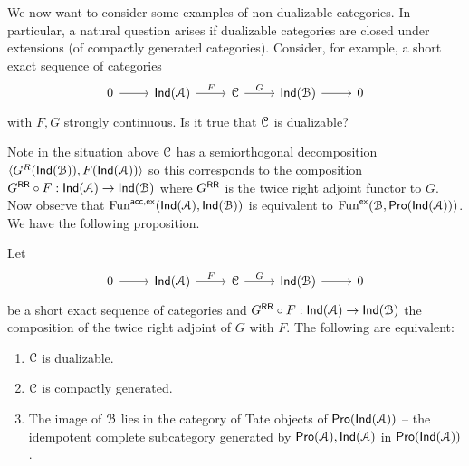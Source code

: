 We now want to consider some examples of non-dualizable categories. In particular, a natural question arises if dualizable categories are closed under extensions (of compactly generated categories). Consider, for example, a short exact sequence of categories 
$$%
\begin{tikzcd}
	0 & {\Ind(\Ascr)} & \Cscr & {\Ind(\Bscr)} & 0
	\arrow[from=1-1, to=1-2]
	\arrow["F", from=1-2, to=1-3]
	\arrow["G", from=1-3, to=1-4]
	\arrow[from=1-4, to=1-5]
\end{tikzcd}$$
with $F,G$ strongly continuous. Is it true that $\EuScript{C}$ is dualizable? 

Note in the situation above $\EuScript{C}$ has a semiorthogonal decomposition $\langle G^{R}(\mathsf{Ind}(\EuScript{B})), F(\mathsf{Ind}(\EuScript{A}))\rangle$ so this corresponds to the composition $G^{\mathsf{R}\mathsf{R}}\circ F:\mathsf{Ind}(\EuScript{A})\to\mathsf{Ind}(\EuScript{B})$ where $G^{\mathsf{R}\mathsf{R}}$ is the twice right adjoint functor to $G$. Now observe that $\mathrm{Fun}^{\mathsf{acc}, \mathsf{ex}}(\mathsf{Ind}(\EuScript{A}),\mathsf{Ind}(\EuScript{B}))$ is equivalent to $\mathrm{Fun}^{\mathsf{ex}}(\EuScript{B},\mathsf{Pro}(\mathsf{Ind}(\EuScript{A})))$. We have the following proposition. 
\begin{proposition}\label{prop: dualizable iff tate objects}
    Let $$%
    \begin{tikzcd}
        0 & {\Ind(\Ascr)} & \Cscr & {\Ind(\Bscr)} & 0
        \arrow[from=1-1, to=1-2]
        \arrow["F", from=1-2, to=1-3]
        \arrow["G", from=1-3, to=1-4]
        \arrow[from=1-4, to=1-5]
    \end{tikzcd}$$
    be a short exact sequence of categories and $G^{\mathsf{R}\mathsf{R}}\circ F:\mathsf{Ind}(\EuScript{A})\to\mathsf{Ind}(\EuScript{B})$ the composition of the twice right adjoint of $G$ with $F$. The following are equivalent:
    \begin{enumerate}[label=(\alph*)]
        \item $\EuScript{C}$ is dualizable. 
        \item $\EuScript{C}$ is compactly generated. 
        \item The image of $\EuScript{B}$ lies in the category of Tate objects of $\mathsf{Pro}(\mathsf{Ind}(\EuScript{A}))$ -- the idempotent complete subcategory generated by $\mathsf{Pro}(\EuScript{A}),\mathsf{Ind}(\EuScript{A})$ in $\mathsf{Pro}(\mathsf{Ind}(\EuScript{A}))$. 
    \end{enumerate}
\end{proposition}
